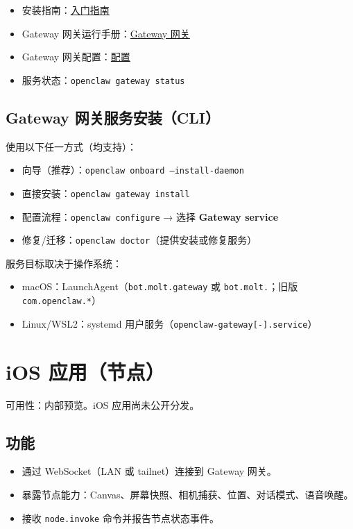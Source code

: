 \begin{itemize}
  \item 安装指南：\href{/start/getting-started}{入门指南}
  \item Gateway 网关运行手册：\href{/gateway}{Gateway 网关}
  \item Gateway 网关配置：\href{/gateway/configuration}{配置}
  \item 服务状态：\texttt{openclaw gateway status}
\end{itemize}


\subsection{Gateway 网关服务安装（CLI）}


使用以下任一方式（均支持）：

\begin{itemize}
  \item 向导（推荐）：\texttt{openclaw onboard --install-daemon}
  \item 直接安装：\texttt{openclaw gateway install}
  \item 配置流程：\texttt{openclaw configure} → 选择 \textbf{Gateway service}
  \item 修复/迁移：\texttt{openclaw doctor}（提供安装或修复服务）
\end{itemize}


服务目标取决于操作系统：

\begin{itemize}
  \item macOS：LaunchAgent（\texttt{bot.molt.gateway} 或 \texttt{bot.molt.}；旧版 \texttt{com.openclaw.*}）
  \item Linux/WSL2：systemd 用户服务（\texttt{openclaw-gateway[-].service}）
\end{itemize}



\clearpage

\section{iOS 应用（节点）}


可用性：内部预览。iOS 应用尚未公开分发。

\subsection{功能}


\begin{itemize}
  \item 通过 WebSocket（LAN 或 tailnet）连接到 Gateway 网关。
  \item 暴露节点能力：Canvas、屏幕快照、相机捕获、位置、对话模式、语音唤醒。
  \item 接收 \texttt{node.invoke} 命令并报告节点状态事件。
\end{itemize}


